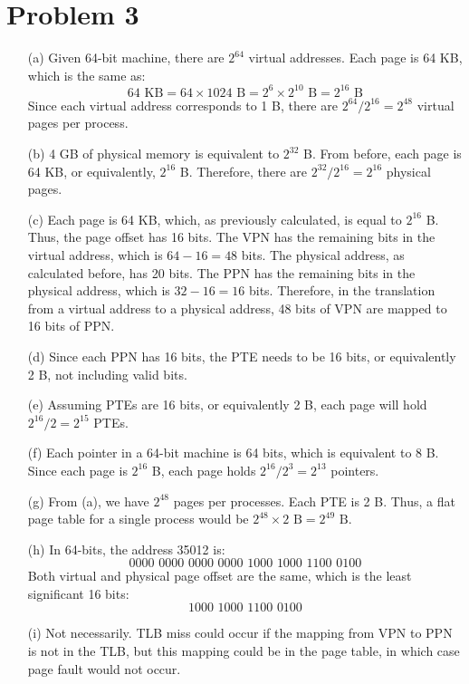 \documentclass{article}
\begin{document}
\section*{Problem 3}
\begin{itemize}
	\item[(a)] Given 64-bit machine, there are $2^{64}$ virtual addresses. Each page is 64 KB, which is the same as:
		$$64 \text{ KB} = 64 \times 1024 \text{ B} = 2^6 \times 2^{10} \text{ B} = 2^{16} \text{ B}$$
	Since each virtual address corresponds to 1 B, there are $2^{64}/2^{16} = 2^{48}$ virtual pages per process.
	
	
	\item[(b)] 4 GB of physical memory is equivalent to $2^{32}$ B. From before, each page is 64 KB, or equivalently, $2^{16}$ B. Therefore, there are $2^{32}/2^{16} = 2^{16}$ physical pages.
	
	
	\item[(c)] Each page is 64 KB, which, as previously calculated, is equal to $2^{16}$ B. Thus, the page offset has 16 bits. The VPN has the remaining bits in the virtual address, which is $64-16 = 48$ bits. The physical address, as calculated before, has 20 bits. The PPN has the remaining bits in the physical address, which is $32-16 = 16$ bits. Therefore, in the translation from a virtual address to a physical address, 48 bits of VPN are mapped to 16 bits of PPN.
	
	
	\item[(d)] Since each PPN has 16 bits, the PTE needs to be 16 bits, or equivalently 2 B, not including valid bits.
	
	\item[(e)] Assuming PTEs are 16 bits, or equivalently 2 B, each page will hold $2^{16}/2 = 2^{15}$ PTEs.
	
	\item[(f)] Each pointer in a 64-bit machine is 64 bits, which is equivalent to 8 B. Since each page is $2^{16}$ B, each page holds $2^{16}/2^3 = 2^{13}$ pointers.
	
	\item[(g)] From (a), we have $2^{48}$ pages per processes. Each PTE is 2 B. Thus, a flat page table for a single process would be $2^{48} \times 2 \text{ B} = 2^{49} \text{ B}$.
	
	\item[(h)] In 64-bits, the address 35012 is:
	$$0000 \,\, 0000\,\, 0000\,\, 0000\,\, 1000\,\, 1000\,\, 1100\,\, 0100$$
	Both virtual and physical page offset are the same, which is the least significant 16 bits:
	$$ 1000\,\, 1000\,\, 1100\,\, 0100$$
	
	\item[(i)] Not necessarily. TLB miss could occur if the mapping from VPN to PPN is not in the TLB, but this mapping could be in the page table, in which case page fault would not occur.
\end{itemize}
\end{document}
